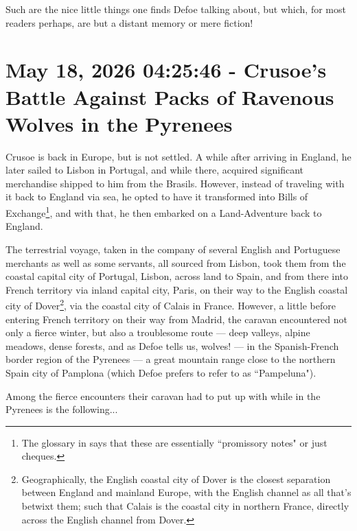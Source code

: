 \documentclass[a4paper]{article}
\begin{document}
Such are the nice little things one finds Defoe talking about, but which, for most readers perhaps, are but a distant memory or mere fiction!





\section{May 18, 2026 04:25:46 - Crusoe's Battle Against Packs of Ravenous Wolves in the Pyrenees}
\label{SEC74}


Crusoe is back in Europe, but is not settled. A while after arriving in England, he later sailed to Lisbon in Portugal, and while there, acquired significant merchandise shipped to him from the Brasils. However, instead of traveling with it back to England via sea, he opted to have it transformed into Bills of Exchange\footnote{The glossary in \cite{Defoe2007} says that these are essentially ``promissory notes" or just cheques.}, and with that, he then embarked on a Land-Adventure back to England. 

The terrestrial voyage, taken in the company of several English and Portuguese merchants as well as some servants, all sourced from Lisbon, took them from the coastal capital city of Portugal, Lisbon, across land to Spain, and from there into French territory via inland capital city, Paris, on their way to the English coastal city of Dover\footnote{Geographically, the English coastal city of Dover is the closest separation between England and mainland Europe, with the English channel as all that's betwixt them; such that Calais is the coastal city in northern France, directly across the English channel from Dover.}, via the coastal city of Calais in France. However, a little before entering French territory on their way from Madrid, the caravan encountered not only a fierce winter, but also a troublesome route --- deep valleys, alpine meadows, dense forests, and as Defoe tells us, wolves! --- in the Spanish-French border region of the Pyrenees --- a great mountain range close to the northern Spain city of Pamplona (which Defoe prefers to refer to as ``Pampeluna").

Among the fierce encounters their caravan had to put up with while in the Pyrenees is the following...
\end{document}

